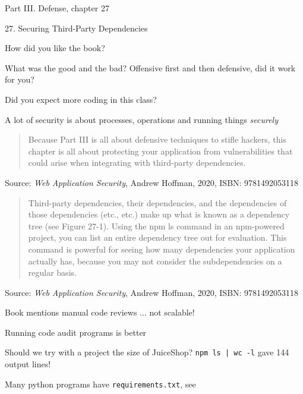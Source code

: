 \documentclass[Screen16to9,17pt]{foils}
\begin{document}
\begin{list1}
\item Part III. Defense, chapter 27
\item 27. Securing Third-Party Dependencies
\end{list1}

How did you like the book?

What was the good and the bad? Offensive first and then defensive, did it work for you?

Did you expect more coding in this class?

A lot of security is about processes, operations and running things \emph{securely}



\begin{quote}
Because Part III is all about defensive techniques to stifle hackers, this chapter is all about protecting your application from vulnerabilities that could arise when integrating with third-party dependencies.
\end{quote}

Source: \emph{Web Application Security}, Andrew Hoffman, 2020, ISBN: 9781492053118






\begin{quote}
Third-party dependencies, their dependencies, and the dependencies of those dependencies (etc., etc.) make up what is known as a dependency tree (see Figure 27-1). Using the npm ls command in an npm-powered project, you can list an entire dependency tree out for evaluation. This command is powerful for seeing how many dependencies your application actually has, because you may not consider the subdependencies on a regular basis.
\end{quote}
Source: \emph{Web Application Security}, Andrew Hoffman, 2020, ISBN: 9781492053118

\begin{list2}
\item Book mentions manual code reviews ... not scalable!
\item Running code audit programs is better
\item Should we try with a project the size of JuiceShop? \verb+npm ls | wc -l+ gave 144 output lines!
\item Many python programs have \verb+requirements.txt+, see 
\end{list2}
\end{document}
